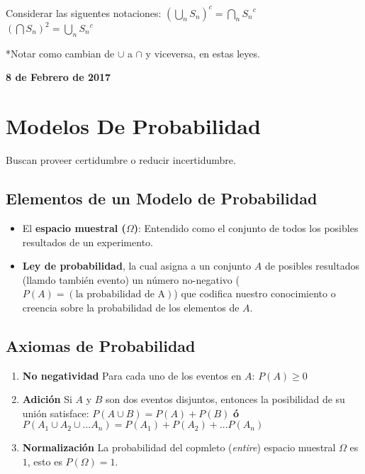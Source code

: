 \documentclass[]{book}
\providecommand{\tightlist}{%
  \setlength{\itemsep}{0pt}\setlength{\parskip}{0pt}}
\begin{document}
Considerar las siguentes notaciones:
\((\bigcup_{n}^{}S_n)^c = \bigcap_{n}^{}{S_n}^c\)\\
 \((\bigcap S_n)^2 = \bigcup_{n}^{}{S_n}^c\)

*Notar como cambian de \(\cup\) a \(\cap\) y viceversa, en estas leyes.

\textbf{8 de Febrero de 2017}

\section{Modelos De Probabilidad}\label{modelos-de-probabilidad-2}

Buscan proveer certidumbre o reducir incertidumbre.

\subsection{Elementos de un Modelo de
Probabilidad}\label{elementos-de-un-modelo-de-probabilidad-2}

\begin{itemize}
\tightlist
\item
  El \textbf{espacio muestral (\(\Omega\))}: Entendido como el conjunto
  de todos los posibles resultados de un experimento.
\item
  \textbf{Ley de probabilidad}, la cual asigna a un conjunto \(A\) de
  posibles resultados (llamdo también evento) un número no-negativo
  (\(P(A) = (\text{la probabilidad de A})\)) que codifica nuestro
  conocimiento o creencia sobre la probabilidad de los elementos de
  \(A\).
\end{itemize}

\subsection{Axiomas de Probabilidad}\label{axiomas-de-probabilidad-2}

\begin{enumerate}
\def\labelenumi{\arabic{enumi}.}
\tightlist
\item
  \textbf{No negatividad} Para cada uno de los eventos en \(A\):
  \(P(A) \geq 0\)
\item
  \textbf{Adición} Si \(A\) y \(B\) son dos eventos disjuntos, entonces
  la posibilidad de su unión satisface: \(P(A \cup B) = P(A)+P(B)\)
  \textbf{ó} \(P(A_1\cup A_2 \cup ...A_n) = P(A_1) + P(A_2)+...P(A_n)\)
\item
  \textbf{Normalización} La probabilidad del copmleto (\emph{entire})
  espacio muestral \(\Omega\) es \(1\), esto es \(P(\Omega) = 1\).
\end{enumerate}
\end{document}
